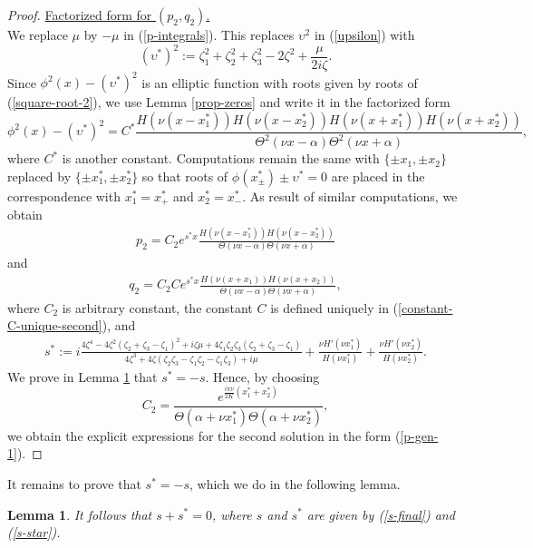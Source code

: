 \documentclass[12pt,reqno]{amsart}
\numberwithin{equation}{section}
\newtheorem{lemma}{Lemma}
\begin{document}
\begin{proof}
\underline{Factorized form for $(p_2,q_2)$.} \\
We replace $\mu$ by $-\mu$ in (\ref{p-integrals}). This replaces $\upsilon^2$ 
in (\ref{upsilon}) with 
$$
(\upsilon^*)^2 := \zeta_1^2 + \zeta_2^2 + \zeta_3^2 - 2 \zeta^2 + \frac{\mu}{2i \zeta}. 
$$
Since $\phi^2(x) - (\upsilon^*)^2$ is an elliptic function with roots given by roots of (\ref{square-root-2}), we use Lemma \ref{prop-zeros} and write it in the factorized form
\begin{equation}
\label{phi-squared-2}
\phi^2(x) - (\upsilon^*)^2 = C^* \frac{H(\nu (x-x_1^*)) H(\nu (x-x_2^*)) 
	H(\nu (x+x_1^*)) H(\nu (x+x_2^*))}{\Theta^2(\nu x - \alpha) \Theta^2(\nu x + \alpha)},
\end{equation}
where $C^*$ is another constant. Computations remain the same with $\{\pm x_1,\pm x_2\}$ replaced by $\{ \pm x_1^*, \pm x_2^*\}$ so that roots of $\phi(x_{\pm}^*) \pm \upsilon^* = 0$ are placed in the correspondence with $x_1^* = x_+^*$ and $x_2^* = x_-^*$. As result of similar computations, we obtain 
\begin{align}
 \label{p-2}
p_2 = C_2 e^{s^* x}  \frac{H(\nu (x-x_1^*)) H(\nu (x-x_2^*))}{\Theta(\nu x - \alpha) \Theta(\nu x + \alpha)}
\end{align}
and 
\begin{align}
 \label{q-2}
q_2 = C_2 C e^{s^* x}  \frac{H(\nu (x+x_1)) H(\nu (x+x_2))}{\Theta(\nu x - \alpha) \Theta(\nu x + \alpha)},
\end{align}
where $C_2$ is arbitrary constant, the constant $C$ is defined uniquely in (\ref{constant-C-unique-second}), and 
\begin{align}
s^* := i \frac{4 \zeta^4 - 4 \zeta^2 (\zeta_2 + \zeta_3 - \zeta_1)^2 
	+ i \zeta \mu + 4 \zeta_1 \zeta_2 \zeta_3 (\zeta_2 + \zeta_3 - \zeta_1)}{4 \zeta^3 + 4 \zeta (\zeta_2 \zeta_3 - \zeta_1 \zeta_2 - \zeta_1 \zeta_3) + i \mu} 
+ \frac{\nu H'(\nu x_1^*)}{H(\nu x_1^*)} + \frac{\nu H'(\nu x_2^*)}{H(\nu x_2^*)}.
\label{s-star}
\end{align}
We prove in Lemma \ref{lem-s} that $s^* = -s$. Hence, by choosing 
$$
C_2 = \frac{e^{\frac{i\pi \nu}{2K} (x_1^* + x_2^*)}}{\Theta(\alpha + \nu x_1^*) \Theta(\alpha + \nu x_2^*)}, 
$$
we obtain the explicit expressions for the second solution in the form (\ref{p-gen-1}).
\end{proof}

It remains to prove that $s^* = -s$, which we do in the following lemma.

\begin{lemma}
	\label{lem-s}
It follows that $s + s^* = 0$, where $s$ and $s^*$ are given by (\ref{s-final}) and (\ref{s-star}).
\end{lemma}
\end{document}
